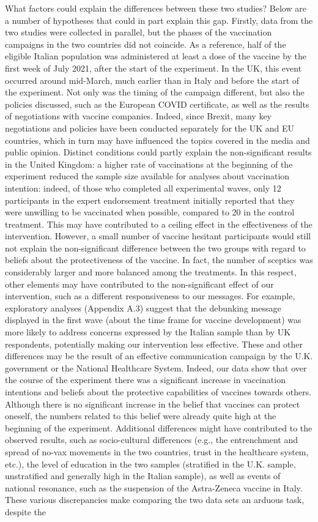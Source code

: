 \documentclass[authordate, empirical]{jote-new-article}
\begin{document}
	What factors could explain the differences between these two studies? Below are a number of hypotheses that could in part explain this gap. Firstly, data from the two studies were collected in parallel, but the phases of the vaccination campaigns in the two countries did not coincide. As a reference, half of the eligible Italian population was administered at least a dose of the vaccine by the first week of July 2021, after the start of the experiment. In the UK, this event occurred around mid-March, much earlier than in Italy and before the start of the experiment. Not only was the timing of the campaign different, but also the policies discussed, such as the European COVID certificate, as well as the results of negotiations with vaccine companies. Indeed, since Brexit, many key negotiations and policies have been conducted separately for the UK and EU countries, which in turn may have influenced the topics covered in the media and public opinion. Distinct conditions could partly explain the non-significant results in the United Kingdom: a higher rate of vaccinations at the beginning of the experiment reduced the sample size available for analyses about vaccination intention: indeed, of those who completed all experimental waves, only 12 participants in the expert endorsement treatment initially reported that they were unwilling to be vaccinated when possible, compared to 20 in the control treatment. This may have contributed to a ceiling effect in the effectiveness of the intervention. However, a small number of vaccine hesitant participants would still not explain the non-significant difference between the two groups with regard to beliefs about the protectiveness of the vaccine. In fact, the number of sceptics was considerably larger and more balanced among the treatments. In this respect, other elements may have contributed to the non-significant effect of our intervention, such as a different responsiveness to our messages. For example, exploratory analyses (Appendix A.3) suggest that the debunking message displayed in the first wave (about the time frame for vaccine development) was more likely to address concerns expressed by the Italian sample than by UK respondents, potentially making our intervention less effective. These and other differences may be the result of an effective communication campaign by the U.K. government or the National Healthcare System. Indeed, our data show that over the course of the experiment there was a significant increase in vaccination intentions and beliefs about the protective capabilities of vaccines towards others. Although there is no significant increase in the belief that vaccines can protect oneself, the numbers related to this belief were already quite high at the beginning of the experiment. Additional differences might have contributed to the observed results, such as socio-cultural differences (e.g., the entrenchment and spread of no-vax movements in the two countries, trust in the healthcare system, etc.), the level of education in the two samples (stratified in the U.K. sample, unstratified and generally high in the Italian sample), as well as events of national resonance, such as the suspension of the Astra-Zeneca vaccine in Italy. These various discrepancies make comparing the two data sets an arduous task, despite the 
\end{document}
